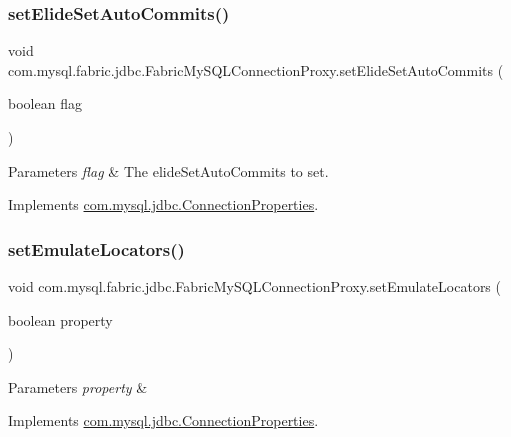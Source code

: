 \subsubsection{\texorpdfstring{set\+Elide\+Set\+Auto\+Commits()}{setElideSetAutoCommits()}}
{\footnotesize\ttfamily void com.\+mysql.\+fabric.\+jdbc.\+Fabric\+My\+S\+Q\+L\+Connection\+Proxy.\+set\+Elide\+Set\+Auto\+Commits (\begin{DoxyParamCaption}\item[{boolean}]{flag }\end{DoxyParamCaption})}


\begin{DoxyParams}{Parameters}
{\em flag} & The elide\+Set\+Auto\+Commits to set. \\
\hline
\end{DoxyParams}


Implements \mbox{\hyperlink{interfacecom_1_1mysql_1_1jdbc_1_1_connection_properties_ae95924c9d1da3b93b44b58b33089d251}{com.\+mysql.\+jdbc.\+Connection\+Properties}}.

\mbox{\label{classcom_1_1mysql_1_1fabric_1_1jdbc_1_1_fabric_my_s_q_l_connection_proxy_afd55a471d2ab8fc81f8590cef9886040}} 
\subsubsection{\texorpdfstring{set\+Emulate\+Locators()}{setEmulateLocators()}}
{\footnotesize\ttfamily void com.\+mysql.\+fabric.\+jdbc.\+Fabric\+My\+S\+Q\+L\+Connection\+Proxy.\+set\+Emulate\+Locators (\begin{DoxyParamCaption}\item[{boolean}]{property }\end{DoxyParamCaption})}


\begin{DoxyParams}{Parameters}
{\em property} & \\
\hline
\end{DoxyParams}


Implements \mbox{\hyperlink{interfacecom_1_1mysql_1_1jdbc_1_1_connection_properties_a3cbd4f864707e036d8013706d632a807}{com.\+mysql.\+jdbc.\+Connection\+Properties}}.

